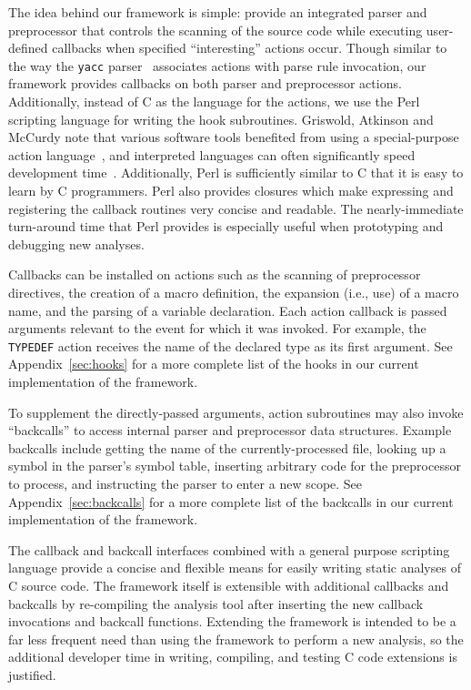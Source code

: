 \documentclass{article}
\newcommand{\Perl}{\mbox{Perl}}
\newcommand{\C}{\mbox{C}}
\newcommand{\ie}{i.e.,}
\begin{document}
The idea behind our framework is simple: provide an integrated parser
and preprocessor that controls the scanning of the source code while
executing user-defined callbacks when specified ``interesting'' actions occur.
Though similar to the way the \texttt{yacc} parser~\cite{Levine92}
associates actions with parse rule invocation, our framework provides
callbacks on both parser and preprocessor actions. Additionally,
instead of \C{} as the language for the actions, we use the \Perl{} scripting
language for writing the hook subroutines.  Griswold, Atkinson and McCurdy note
that various software tools benefited from using a special-purpose
action language~\cite{Griswold96}, and interpreted languages can
often significantly speed development time~\cite{Scripting}.
Additionally, \Perl{} is sufficiently similar to \C{} that it is easy to 
learn by \C{} programmers.  \Perl{} also provides closures which make
expressing and registering the callback routines very concise and
readable. The nearly-immediate turn-around time that
\Perl{} provides is especially useful when prototyping and debugging new 
analyses.


Callbacks can be installed on actions such as the scanning of preprocessor directives, the
creation of a macro definition, the expansion (\ie{} use) of a macro
name, and the parsing of a variable declaration.  Each action callback
is passed arguments relevant to the event for which it was invoked.  For
example, the \texttt{TYPEDEF} action receives the name of the declared
type as its first argument.  See Appendix~\ref{sec:hooks} for a more complete list of
the hooks in our current implementation of the framework.

To supplement the directly-passed arguments, action subroutines may also invoke
``backcalls'' to access internal
parser and preprocessor data structures. Example backcalls include
getting the name of the currently-processed file, looking up a symbol in
the parser's symbol table, inserting arbitrary code for the preprocessor
to process, and instructing the parser to enter a new scope. 
See Appendix~\ref{sec:backcalls} for a more complete list of
the backcalls in our current implementation of the framework.

The callback and backcall interfaces combined with a general
purpose scripting language provide a concise and flexible means for
easily writing static analyses of \C{} source code.  The framework
itself is extensible with additional callbacks and backcalls by
re-compiling the analysis tool after inserting the new callback
invocations and backcall functions.  Extending the framework is intended 
to be a far less frequent need than using the framework to perform a new 
analysis, so the additional developer time in writing, compiling, and
testing C code extensions is justified.
\end{document}
